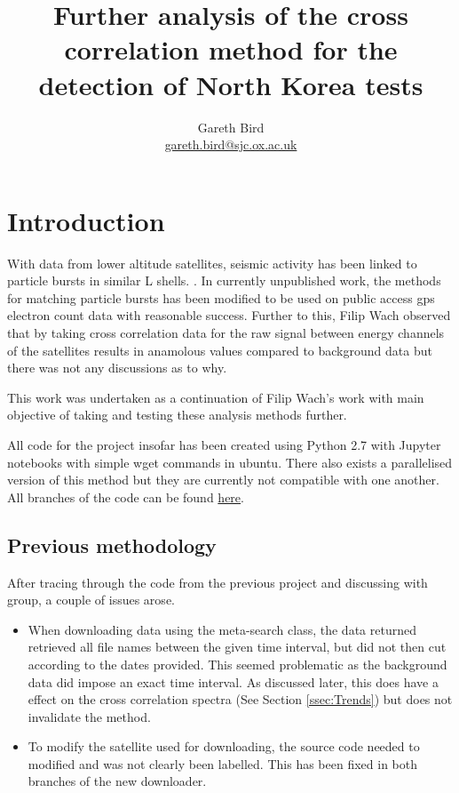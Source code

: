 \documentclass[12pt,a4paper]{article}
\title{Further analysis of the cross correlation method for the detection of North Korea tests}
\author{Gareth Bird \\ \href{mailto:gareth.bird@sjc.ox.ac.uk}{gareth.bird@sjc.ox.ac.uk}}
\affil{University of Oxford}
\begin{document}
\maketitle
\begin{abstract}
	
\end{abstract}
\section{Introduction}
	With data from lower altitude satellites, seismic activity has been linked to particle bursts in similar L shells. \cite{aleksandrin2003high}. In currently unpublished work, the methods for matching particle bursts has been modified to be used on public access gps electron count data with reasonable success. Further to this, Filip Wach observed that by taking cross correlation data for the raw signal between energy channels of the satellites results in anamolous values compared to background data but there was not any discussions as to why.\cite{filipwach2017}
	
	This work was undertaken as a continuation of Filip Wach's work with main objective of taking and testing these analysis methods further.
	
	All code for the project insofar has been created using Python 2.7 with Jupyter notebooks with simple wget commands in ubuntu. There also exists a parallelised version of this method but they are currently not compatible with one another. All branches of the code can be found \href{https://github.com/fw14863/SP_2017/network}{here}.
	\subsection{Previous methodology}
	After tracing through the code from the previous project and discussing with group, a couple of issues arose.
	\begin{itemize}
		\item
		When downloading data using the meta-search class, the data returned retrieved all file names between the given time interval, but did not then cut according to the dates provided. This seemed problematic as the background data did impose an exact time interval. As discussed later, this does have a effect on the cross correlation spectra (See Section \ref{ssec:Trends}) but does not invalidate the method.
		\item
		To modify the satellite used for downloading, the source code needed to modified and was not clearly been labelled. This has been fixed in both branches of the new downloader.
	\end{itemize}
	
\end{document}
